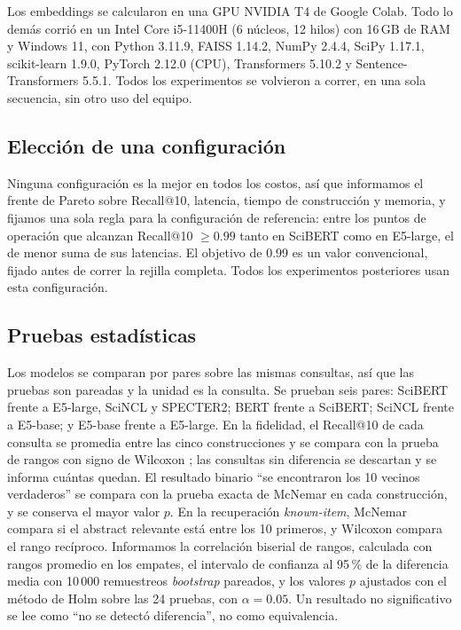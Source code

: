 \documentclass[runningheads]{llncs}
\begin{document}
Los embeddings se calcularon en una GPU NVIDIA T4 de Google Colab. Todo lo demás corrió en
un Intel Core i5-11400H (6 núcleos, 12 hilos) con 16\,GB de RAM y Windows 11, con Python
3.11.9, FAISS 1.14.2, NumPy 2.4.4, SciPy 1.17.1, scikit-learn 1.9.0, PyTorch 2.12.0 (CPU),
Transformers 5.10.2 y Sentence-Transformers 5.5.1. Todos los experimentos se volvieron a
correr, en una sola secuencia, sin otro uso del equipo.

\subsection{Elección de una configuración}

Ninguna configuración es la mejor en todos los costos, así que informamos el frente de Pareto
sobre Recall@10, latencia, tiempo de construcción y memoria, y fijamos una sola regla para la
configuración de referencia: entre los puntos de operación que alcanzan Recall@10 $\geq 0.99$
tanto en SciBERT como en E5-large, el de menor suma de sus latencias. El objetivo de 0.99 es un valor
convencional, fijado antes de correr la rejilla completa. Todos los experimentos posteriores
usan esta configuración.

\subsection{Pruebas estadísticas}

Los modelos se comparan por pares sobre las mismas consultas, así que las pruebas son
pareadas y la unidad es la consulta. Se prueban seis pares: SciBERT frente a E5-large, SciNCL
y SPECTER2; BERT frente a SciBERT; SciNCL frente a E5-base; y E5-base frente a E5-large. En la
fidelidad, el Recall@10 de cada consulta se promedia entre las cinco construcciones y se
compara con la prueba de rangos con signo de Wilcoxon \cite{wilcoxon1945}; las consultas sin
diferencia se descartan y se informa cuántas quedan. El resultado binario ``se encontraron los
10 vecinos verdaderos'' se compara con la prueba exacta de McNemar \cite{mcnemar1947} en cada
construcción, y se conserva el mayor valor $p$. En la recuperación \textit{known-item},
McNemar compara si el abstract relevante está entre los 10 primeros, y Wilcoxon compara el
rango recíproco. Informamos la correlación biserial de rangos, calculada con rangos promedio
en los empates, el intervalo de confianza al 95\,\% de la diferencia media con 10\,000
remuestreos \textit{bootstrap} pareados, y los valores $p$ ajustados con el método de Holm
\cite{holm1979} sobre las 24 pruebas, con $\alpha=0.05$. Un resultado no significativo se lee
como ``no se detectó diferencia'', no como equivalencia.
\end{document}

